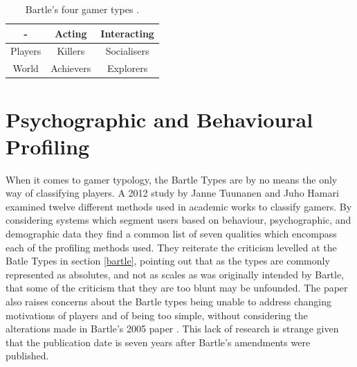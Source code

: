 \documentclass[12pt,a4paper,twoside]{report}
\begin{document}
\begin{table}
\begin{center}
\begin{tabular}{|c|c|c|}
	\hline - & Acting & Interacting \\ 
	\hline Players & Killers & Socialisers \\ 
	\hline World & Achievers & Explorers \\ 
	\hline 
\end{tabular}
\end{center}
\caption{Bartle's four gamer types \cite{bartle1996hearts}.}
\label{table:cards}
\end{table}

\section{Psychographic and Behavioural Profiling}
When it comes to gamer typology, the Bartle Types are by no means the only way of classifying players. A 2012 study by Janne Tuunanen and Juho Hamari \cite{tuunanen2012meta} examined twelve different methods used in academic works to classify gamers. By considering systems which segment users based on behaviour, psychographic, and demographic data they find a common list of seven qualities which encompass each of the profiling methods used. They reiterate the criticism levelled at the Batle Types in section \ref{bartle}, pointing out that as the types are commonly represented as absolutes, and not as scales as was originally intended by Bartle, that some of the criticism that they are too blunt may be unfounded. The paper also raises concerns about the Bartle types being unable to address changing motivations of players and of being too simple, without considering the alterations made in Bartle's 2005 paper \cite{bartle2005play}. This lack of research is strange given that the publication date is seven years after Bartle's amendments were published.
\end{document}
